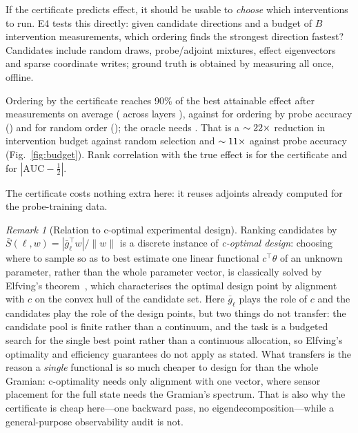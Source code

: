 \documentclass[11pt]{article}
\theoremstyle{definition}
\theoremstyle{remark}
\newtheorem{remark}{Remark}
\newcommand{\Sbar}{\bar{S}}
\newcommand{\gbar}{\bar{g}}
\begin{document}
If the certificate predicts effect, it should be usable to \emph{choose} which
interventions to run. E4 tests this directly: given \EfourM{} candidate
directions and a budget of $B$ intervention measurements, which ordering finds
the strongest direction fastest? Candidates include random draws,
probe/adjoint mixtures, effect eigenvectors and sparse coordinate writes;
ground truth is obtained by measuring all \EfourM{} once, offline.

Ordering by the certificate reaches 90\% of the best attainable effect after
\EfourCertNinety{} measurements on average (\EfourCertNinetyList{} across
layers \EfourLayers), against \EfourAucNinety{} for ordering by probe accuracy
(\EfourAucNinetyList) and \EfourRandNinety{} for random order
(\EfourRandNinetyList); the oracle needs \EfourOracleNinety{}. That is a
\textbf{$\sim22\times$} reduction in intervention budget
against random selection and $\sim11\times$ against probe
accuracy (Fig.~\ref{fig:budget}). Rank correlation with the true effect is
\EfourSpSbar{} for the certificate and \EfourSpAUC{} for $|\mathrm{AUC}-\tfrac12|$.

The certificate costs nothing extra here: it reuses adjoints already computed
for the probe-training data.

\begin{remark}[Relation to c-optimal experimental design]
\label{rem:elfving}
Ranking candidates by $\Sbar(\ell,w)=|\gbar_\ell^\top w|/\|w\|$ is a discrete
instance of \emph{c-optimal design}: choosing where to sample so as to best
estimate one linear functional $c^\top\theta$ of an unknown parameter, rather
than the whole parameter vector, is classically solved by Elfving's
theorem~\cite{elfving1952}, which characterises the optimal design point by
alignment with $c$ on the convex hull of the candidate set. Here $\gbar_\ell$
plays the role of $c$ and the \EfourM{} candidates play the role of the design
points, but two things do not transfer: the candidate pool is finite rather
than a continuum, and the task is a budgeted search for the single best point
rather than a continuous allocation, so Elfving's optimality and efficiency
guarantees do not apply as stated. What transfers is the reason a
\emph{single} functional is so much cheaper to design for than the whole
Gramian: c-optimality needs only alignment with one vector, where sensor
placement for the full state needs the Gramian's spectrum. That is also why
the certificate is cheap here---one backward pass, no eigendecomposition---while
a general-purpose observability audit is not.
\end{remark}
\end{document}
